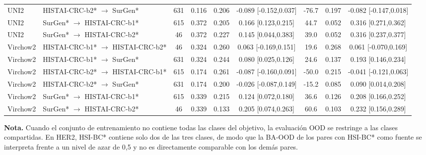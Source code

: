 \begin{table}[htbp]
{\begin{tabular}{l l c c c c c c c}
UNI2 & HISTAI-CRC-b2* $\rightarrow$ SurGen* & 631 & 0.116 & 0.206 & -0.089 [-0.152,0.037] & -76.7 & 0.197 & -0.082 [-0.147,0.018] \\
UNI2 & SurGen* $\rightarrow$ HISTAI-CRC-b1* & 615 & 0.372 & 0.205 & 0.166 [0.123,0.215] & 44.7 & 0.052 & 0.316 [0.271,0.362] \\
UNI2 & SurGen* $\rightarrow$ HISTAI-CRC-b2* & 46 & 0.372 & 0.227 & 0.145 [0.044,0.383] & 39.0 & 0.052 & 0.316 [0.237,0.377] \\
Virchow2 & HISTAI-CRC-b1* $\rightarrow$ HISTAI-CRC-b2* & 46 & 0.324 & 0.260 & 0.063 [-0.169,0.151] & 19.6 & 0.268 & 0.061 [-0.070,0.169] \\
Virchow2 & HISTAI-CRC-b1* $\rightarrow$ SurGen* & 631 & 0.324 & 0.244 & 0.080 [0.025,0.126] & 24.6 & 0.137 & 0.193 [0.146,0.234] \\
Virchow2 & HISTAI-CRC-b2* $\rightarrow$ HISTAI-CRC-b1* & 615 & 0.174 & 0.261 & -0.087 [-0.160,0.091] & -50.0 & 0.215 & -0.041 [-0.121,0.063] \\
Virchow2 & HISTAI-CRC-b2* $\rightarrow$ SurGen* & 631 & 0.174 & 0.200 & -0.026 [-0.087,0.149] & -15.2 & 0.085 & 0.090 [0.014,0.208] \\
Virchow2 & SurGen* $\rightarrow$ HISTAI-CRC-b1* & 615 & 0.339 & 0.215 & 0.124 [0.072,0.180] & 36.6 & 0.126 & 0.208 [0.166,0.252] \\
Virchow2 & SurGen* $\rightarrow$ HISTAI-CRC-b2* & 46 & 0.339 & 0.133 & 0.205 [0.074,0.263] & 60.6 & 0.103 & 0.232 [0.156,0.289] \\
\bottomrule
\end{tabular}}%
\end{table}

\par\medskip\noindent\footnotesize \textbf{Nota.} Cuando el conjunto de entrenamiento no contiene todas las clases del objetivo, la evaluación OOD se restringe a las clases compartidas. En HER2, HSI-BC* contiene solo dos de las tres clases, de modo que la BA-OOD de los pares con HSI-BC* como fuente se interpreta frente a un nivel de azar de 0,5 y no es directamente comparable con los demás pares.
